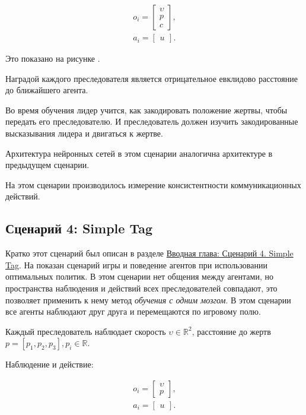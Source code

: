 \begin{equation}
    \begin{multlined}
        o_i = \begin{bmatrix}
                  \upsilon \\ p \\ c
        \end{bmatrix}, \\
        a_i = \begin{bmatrix}
                  u
        \end{bmatrix}.
    \end{multlined}
\end{equation}

Это показано на рисунке .

Наградой каждого преследователя является отрицательное евклидово расстояние до ближайшего агента.

Во время обучения лидер учится, как закодировать положение жертвы, чтобы передать его преследователю. И преследователь должен изучить закодированные высказывания лидера и двигаться к жертве.

Архитектура нейронных сетей в этом сценарии аналогична архитектуре в предыдущем сценарии.

На этом сценарии производилось измерение консистентности коммуникационных действий.

\subsection{Сценарий 4: Simple Tag} \label{exp-st}

Кратко этот сценарий был описан в разделе \hyperref[intro-st]{Вводная глава: Сценарий 4. Simple Tag}. На  показан сценарий игры и поведение агентов при использовании оптимальных политик. В этом сценарии нет общения между агентами, но пространства наблюдения и действий всех преследователей совпадают, это позволяет применить к нему метод \textit{обучения с одним мозгом}. В этом сценарии все агенты наблюдают друг друга и перемещаются по игровому полю.

Каждый преследователь наблюдает скорость $\upsilon \in \mathbb{R}^2$, расстояние до жертв ${p = [p_1, p_2, p_3], p_i \in \mathbb{R}}$.

Наблюдение и действие:

\begin{equation}
    \begin{multlined}
        o_i = \begin{bmatrix}
                  \upsilon \\ p
        \end{bmatrix}, \\
        a_i = \begin{bmatrix}
                  u
        \end{bmatrix}.
    \end{multlined}
\end{equation}

